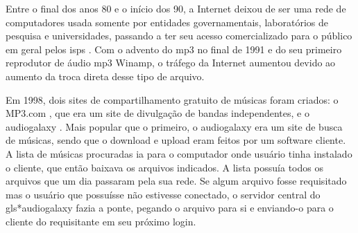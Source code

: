 



Entre o final dos anos 80 e o início dos 90, a Internet deixou de ser uma rede de
computadores usada somente por entidades governamentais, laboratórios de pesquisa e
universidades, passando a ter seu acesso comercializado para o público em geral pelos
\glspl{isp} \cite{site:wiki-isp}. Com o advento do \gls{mp3} \cite{site:wiki-mp3} no
final de 1991  e do seu
primeiro reprodutor de áudio \gls*{mp3}  Winamp, o tráfego da Internet aumentou devido
ao aumento da troca direta desse tipo de arquivo.

Em 1998, dois sites de compartilhamento gratuito de músicas foram criados: o MP3.com
\cite{site:wiki-mp3.com}, que era um site de divulgação de bandas independentes, e o
\gls{audiogalaxy} \cite{site:wiki-audiogalaxy.com,revista:pnp}. Mais popular que o primeiro, o
\gls*{audiogalaxy} era um site de busca de músicas, sendo que o download e upload eram
feitos por um software cliente. A lista de músicas procuradas ia para o computador onde
usuário tinha instalado o cliente, que então baixava os arquivos indicados.
A lista possuía todos os arquivos que um dia passaram pela sua rede. Se algum arquivo
fosse requisitado mas o usuário que possuísse não estivesse conectado, o servidor
central do gls*{audiogalaxy} fazia a ponte, pegando o arquivo para si e enviando-o para
o cliente do requisitante em seu próximo login.

